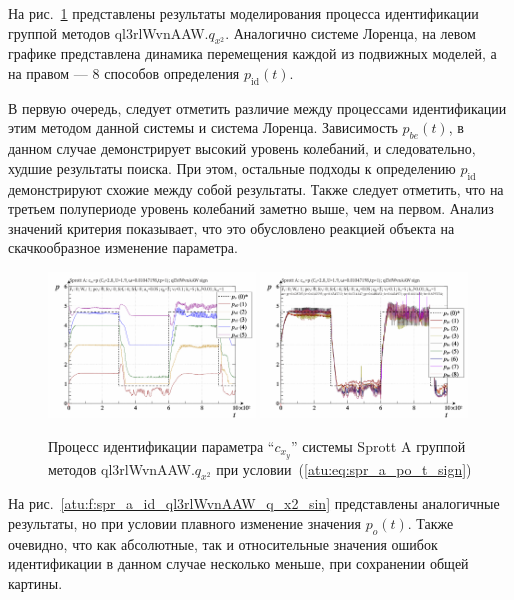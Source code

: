 На рис.~\ref{atu:f:spr_a_id_ql3rlWvnAAW_q_x2_sign} представлены результаты
моделирования процесса идентификации
группой методов ql3rlWvnAAW.$q_{x^2}$. Аналогично системе Лоренца, на левом графике представлена
динамика перемещения каждой из подвижных моделей,
а на правом --- 8 способов определения $p_\mathrm{id}(t)$.

В первую очередь, следует отметить различие между процессами
идентификации этим методом данной системы и система Лоренца.
Зависимость $p_{be}(t)$, в данном случае демонстрирует
высокий уровень колебаний, и следовательно,
худшие результаты поиска. При этом,
остальные подходы к определению $p_\mathrm{id}$
демонстрируют схожие между собой результаты.
Также следует отметить, что на третьем полупериоде уровень колебаний заметно выше,
чем на первом. Анализ значений критерия показывает, что это обусловлено
реакцией объекта на скачкообразное изменение параметра.


\begin{figure}[htb!]
  \centerline{
    \includegraphics[width=0.49\textwidth]{p/cha/spr_a/ql3rlWvnAAW_x2/sprott_a_id-p_t_pi_ql3rlWvnAAW_sign.png}
    \hfill
    \includegraphics[width=0.49\textwidth]{p/cha/spr_a/ql3rlWvnAAW_x2/sprott_a_id-p_t_p_ql3rlWvnAAW_sign.png}
  }
  \caption{Процесс идентификации параметра ``$c_{x_y}$'' системы Sprott A группой методов ql3rlWvnAAW.$q_{x^2}$ при условии~(\ref{atu:eq:spr_a_po_t_sign})}
  \label{atu:f:spr_a_id_ql3rlWvnAAW_q_x2_sign}
\end{figure}

На рис.~\ref{atu:f:spr_a_id_ql3rlWvnAAW_q_x2_sin} представлены аналогичные результаты,
но при условии плавного изменение значения $p_o(t)$. Также очевидно, что
как абсолютные, так и относительные значения ошибок идентификации в данном случае несколько
меньше, при сохранении общей картины.

